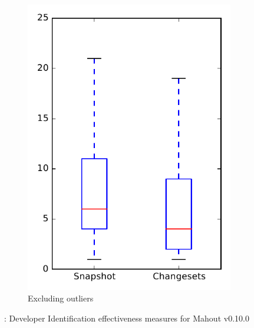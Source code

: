 \begin{figure}
\begin{subfigure}{.4\textwidth}
        \includegraphics[height=0.4\textheight]{figures/dit/rq1_mahout_no_outlier}
        \caption{Excluding outliers}\label{fig:dit:rq1:mahout_no_outlier}
    \end{subfigure}
\caption{\done: Developer Identification effectiveness measures for Mahout v0.10.0}
\label{fig:dit:rq1:mahout}
\end{figure}
